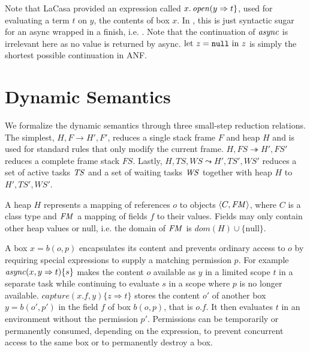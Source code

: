 Note that LaCasa provided an expression called $x.\mathop{\mathit{open}}(y \Rightarrow t \}$, used for evaluating a term $t$ on $y$, the contents of box $x$. In \plc, this is just syntactic sugar for an async wrapped in a finish, i.e. . Note that the continuation of $\mathop{\mathit{async}}$ is irrelevant here as no value is returned by async. $\text{let } z = \texttt{null} \text{ in } z$ is simply the shortest possible continuation in ANF.

\section{Dynamic Semantics}
We formalize the dynamic semantics through three small-step reduction relations. The simplest, $H, F \rightarrow H', F'$, reduces a single stack frame $F$ and heap $H$ and is used for standard rules that only modify the current frame. $H, FS \twoheadrightarrow H', FS'$ reduces a complete frame stack $FS$. Lastly, $H, TS, WS \leadsto H', TS', WS'$ reduces a set of active tasks $\mathop{\mathit{TS}}$ and a set of waiting tasks $\mathop{\mathit{WS}}$ together with heap $H$ to $H', TS', WS'$.

A heap $H$ represents a mapping of references $o$ to objects $\langle C, \mathop{\mathit{FM}} \rangle$, where $C$ is a class type and $\mathop{\mathit{FM}}$ a mapping of fields $f$ to their values. Fields may only contain other heap values or null, i.e. the domain of $\mathop{\mathit{FM}}$ is $dom(H) \cup \{\text{null}\}$.

A box $x = b(o,p)$ encapsulates its content and prevents ordinary access to $o$ by requiring special expressions to supply a matching permission $p$. For example $\mathop{\mathit{async}}(x, y \Rightarrow t)\{s\}$ makes the content $o$ available as $y$ in a limited scope $t$ in a separate task while continuing to evaluate $s$ in a scope where $p$ is no longer available. $capture(x.f, y)\{ z \Rightarrow t\}$ stores the content $o'$ of another box $y = b(o',p')$ in the field $f$ of box $b(o,p)$, that is $o.f$. It then evaluates $t$ in an environment without the permission $p'$. Permissions can be temporarily or permanently consumed, depending on the expression, to prevent concurrent access to the same box or to permanently destroy a box.



